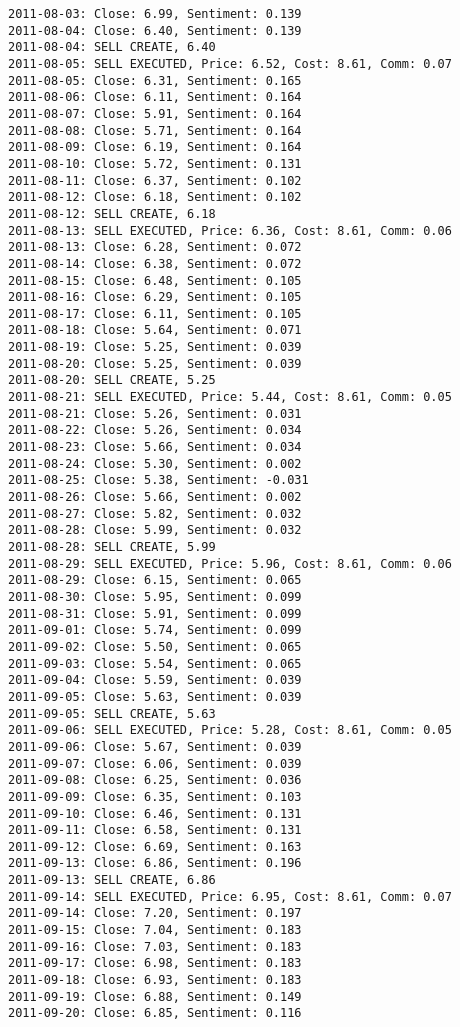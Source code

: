 \documentclass[11pt]{article}
\begin{document}
\begin{Verbatim}[commandchars=\\\{\}]
2011-08-03: Close: 6.99, Sentiment: 0.139
2011-08-04: Close: 6.40, Sentiment: 0.139
2011-08-04: SELL CREATE, 6.40
2011-08-05: SELL EXECUTED, Price: 6.52, Cost: 8.61, Comm: 0.07
2011-08-05: Close: 6.31, Sentiment: 0.165
2011-08-06: Close: 6.11, Sentiment: 0.164
2011-08-07: Close: 5.91, Sentiment: 0.164
2011-08-08: Close: 5.71, Sentiment: 0.164
2011-08-09: Close: 6.19, Sentiment: 0.164
2011-08-10: Close: 5.72, Sentiment: 0.131
2011-08-11: Close: 6.37, Sentiment: 0.102
2011-08-12: Close: 6.18, Sentiment: 0.102
2011-08-12: SELL CREATE, 6.18
2011-08-13: SELL EXECUTED, Price: 6.36, Cost: 8.61, Comm: 0.06
2011-08-13: Close: 6.28, Sentiment: 0.072
2011-08-14: Close: 6.38, Sentiment: 0.072
2011-08-15: Close: 6.48, Sentiment: 0.105
2011-08-16: Close: 6.29, Sentiment: 0.105
2011-08-17: Close: 6.11, Sentiment: 0.105
2011-08-18: Close: 5.64, Sentiment: 0.071
2011-08-19: Close: 5.25, Sentiment: 0.039
2011-08-20: Close: 5.25, Sentiment: 0.039
2011-08-20: SELL CREATE, 5.25
2011-08-21: SELL EXECUTED, Price: 5.44, Cost: 8.61, Comm: 0.05
2011-08-21: Close: 5.26, Sentiment: 0.031
2011-08-22: Close: 5.26, Sentiment: 0.034
2011-08-23: Close: 5.66, Sentiment: 0.034
2011-08-24: Close: 5.30, Sentiment: 0.002
2011-08-25: Close: 5.38, Sentiment: -0.031
2011-08-26: Close: 5.66, Sentiment: 0.002
2011-08-27: Close: 5.82, Sentiment: 0.032
2011-08-28: Close: 5.99, Sentiment: 0.032
2011-08-28: SELL CREATE, 5.99
2011-08-29: SELL EXECUTED, Price: 5.96, Cost: 8.61, Comm: 0.06
2011-08-29: Close: 6.15, Sentiment: 0.065
2011-08-30: Close: 5.95, Sentiment: 0.099
2011-08-31: Close: 5.91, Sentiment: 0.099
2011-09-01: Close: 5.74, Sentiment: 0.099
2011-09-02: Close: 5.50, Sentiment: 0.065
2011-09-03: Close: 5.54, Sentiment: 0.065
2011-09-04: Close: 5.59, Sentiment: 0.039
2011-09-05: Close: 5.63, Sentiment: 0.039
2011-09-05: SELL CREATE, 5.63
2011-09-06: SELL EXECUTED, Price: 5.28, Cost: 8.61, Comm: 0.05
2011-09-06: Close: 5.67, Sentiment: 0.039
2011-09-07: Close: 6.06, Sentiment: 0.039
2011-09-08: Close: 6.25, Sentiment: 0.036
2011-09-09: Close: 6.35, Sentiment: 0.103
2011-09-10: Close: 6.46, Sentiment: 0.131
2011-09-11: Close: 6.58, Sentiment: 0.131
2011-09-12: Close: 6.69, Sentiment: 0.163
2011-09-13: Close: 6.86, Sentiment: 0.196
2011-09-13: SELL CREATE, 6.86
2011-09-14: SELL EXECUTED, Price: 6.95, Cost: 8.61, Comm: 0.07
2011-09-14: Close: 7.20, Sentiment: 0.197
2011-09-15: Close: 7.04, Sentiment: 0.183
2011-09-16: Close: 7.03, Sentiment: 0.183
2011-09-17: Close: 6.98, Sentiment: 0.183
2011-09-18: Close: 6.93, Sentiment: 0.183
2011-09-19: Close: 6.88, Sentiment: 0.149
2011-09-20: Close: 6.85, Sentiment: 0.116

\end{Verbatim}
\end{document}
